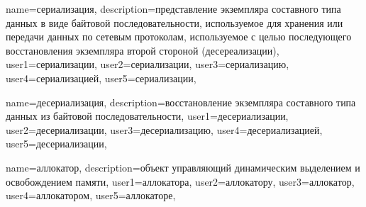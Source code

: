 {
    name=сериализация,
    description={представление экземпляра составного типа данных в виде
    байтовой последовательности, используемое для хранения или
    передачи данных по сетевым протоколам, используемое с целью последующего
    восстановления экземпляра второй стороной (десереализации)},
    user1=сериализации, %
    user2=сериализации, %
    user3=сериализацию, %
    user4=сериализацией, %
    user5=сериализации, %
}

{
    name=десериализация,
    description={восстановление экземпляра составного типа данных из
    байтовой последовательности},
    user1=десериализации, %
    user2=десериализации, %
    user3=десериализацию, %
    user4=десериализацией, %
    user5=десериализации, %
}

{
    name=аллокатор,
    description={объект управляющий динамическим выделением и освобождением памяти},
    user1=аллокатора, %
    user2=аллокатору, %
    user3=аллокатор, %
    user4=аллокатором, %
    user5=аллокаторе, %
}


\newcommand{\glsgenitive}[1]{\glsuseri{#1}}   %
\newcommand{\glsdative}[1]{\glsuserii{#1}}  %
\newcommand{\glsaccusative}[1]{\glsuseriii{#1}}  %
\newcommand{\glsinstrumental}[1]{\glsuseriv{#1}} %
\newcommand{\glsprepositional}[1]{\glsuserv{#1}}  %


